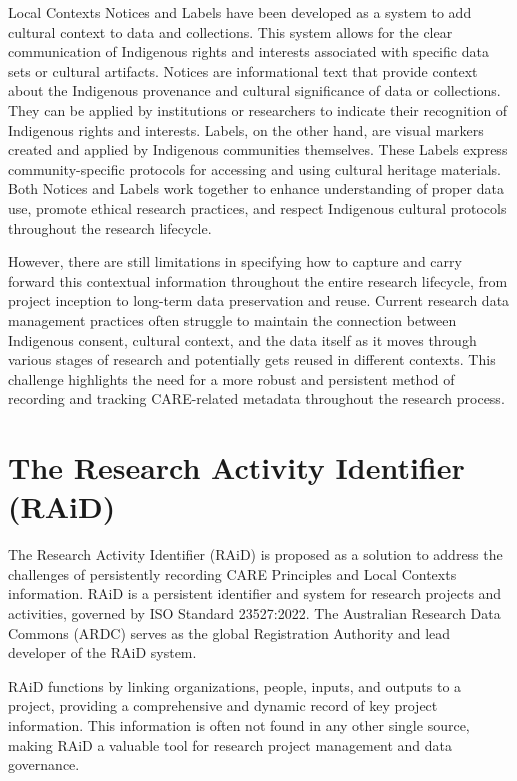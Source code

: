 \documentclass[a0,portrait]{a0poster}
\begin{document}
\begin{multicols}{2}
{Local Contexts Notices and Labels have been developed as a system to add cultural context to data and collections. This system allows for the clear communication of Indigenous rights and interests associated with specific data sets or cultural artifacts. Notices are informational text that provide context about the Indigenous provenance and cultural significance of data or collections. They can be applied by institutions or researchers to indicate their recognition of Indigenous rights and interests. Labels, on the other hand, are visual markers created and applied by Indigenous communities themselves. These Labels express community-specific protocols for accessing and using cultural heritage materials. Both Notices and Labels work together to enhance understanding of proper data use, promote ethical research practices, and respect Indigenous cultural protocols throughout the research lifecycle.

However, there are still limitations in specifying how to capture and carry forward this contextual information throughout the entire research lifecycle, from project inception to long-term data preservation and reuse. Current research data management practices often struggle to maintain the connection between Indigenous consent, cultural context, and the data itself as it moves through various stages of research and potentially gets reused in different contexts. This challenge highlights the need for a more robust and persistent method of recording and tracking CARE-related metadata throughout the research process.
}

\color{ARDCYellow}
\section*{\LARGE The Research Activity Identifier (RAiD)}
\color{DarkGrey}
\large{
The Research Activity Identifier (RAiD) is proposed as a solution to address the challenges of persistently recording CARE Principles and Local Contexts information. RAiD is a persistent identifier and system for research projects and activities, governed by ISO Standard 23527:2022. The Australian Research Data Commons (ARDC) serves as the global Registration Authority and lead developer of the RAiD system.

RAiD functions by linking organizations, people, inputs, and outputs to a project, providing a comprehensive and dynamic record of key project information. This information is often not found in any other single source, making RAiD a valuable tool for research project management and data governance.

}
\end{multicols}
\end{document}
